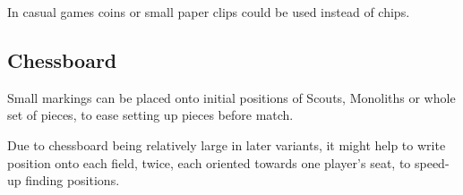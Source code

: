 In casual games coins or small paper clips could be used instead of chips.

\subsection*{Chessboard}
\label{sec:Remarks/Well-defined game/Chessboard}

Small markings can be placed onto initial positions of Scouts, Monoliths
or whole set of pieces, to ease setting up pieces before match.

Due to chessboard being relatively large in later variants, it might help to
write  position onto each field, twice, each oriented towards one
player's seat, to speed-up finding positions.











\clearpage %
